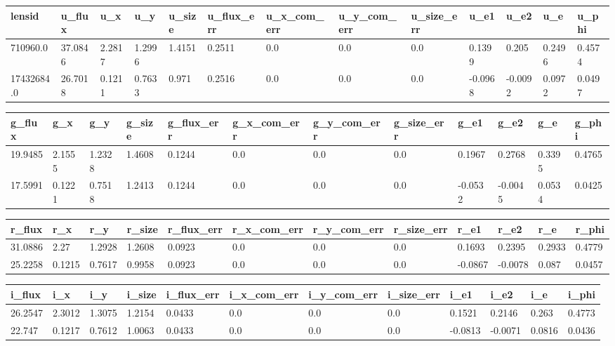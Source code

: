 \documentclass[\docopts]{\docclass}
\begin{document}
\begin{table}[!h]
\centering

\begin{tabular}{|l|l|l|l|l|l|l|l|l|l|l|l|l|}
\hline
lensid     & u\_flux & u\_x   & u\_y   & u\_size & u\_flux\_err & u\_x\_com\_err & u\_y\_com\_err & u\_size\_err & u\_e1   & u\_e2   & u\_e   & u\_phi \\ \hline
710960.0   & 37.0846 & 2.2817 & 1.2996 & 1.4151  & 0.2511       & 0.0            & 0.0            & 0.0          & 0.1399  & 0.205   & 0.2496 & 0.4574 \\ \hline
17432684.0 & 26.7018 & 0.1211 & 0.7633 & 0.971   & 0.2516       & 0.0            & 0.0            & 0.0          & -0.0968 & -0.0092 & 0.0972 & 0.0497 \\ \hline
\end{tabular}

\begin{tabular}{|l|l|l|l|l|l|l|l|l|l|ll|}
\hline
g\_flux & g\_x   & g\_y   & g\_size & g\_flux\_err & g\_x\_com\_err & g\_y\_com\_err & g\_size\_err & g\_e1   & g\_e2   & g\_e   & g\_phi	\\ \hline
19.9485 & 2.1555 & 1.2328 & 1.4608  & 0.1244       & 0.0            & 0.0            & 0.0          & 0.1967  & 0.2768  & 0.3395 & 0.4765 \\ \hline
17.5991 & 0.1221 & 0.7518 & 1.2413  & 0.1244       & 0.0            & 0.0            & 0.0          & -0.0532 & -0.0045 & 0.0534	& 0.0425	\\ \hline
\end{tabular}


\begin{tabular}{|l|l|l|l|l|l|l|l|l|l|l|l|}
\hline
r\_flux & r\_x   & r\_y   & r\_size & r\_flux\_err & r\_x\_com\_err & r\_y\_com\_err & r\_size\_err & r\_e1   & r\_e2   & r\_e   & r\_phi \\ \hline
31.0886 & 2.27   & 1.2928 & 1.2608  & 0.0923       & 0.0            & 0.0            & 0.0          & 0.1693  & 0.2395  & 0.2933 & 0.4779 \\
25.2258 & 0.1215 & 0.7617 & 0.9958  & 0.0923       & 0.0            & 0.0            & 0.0          & -0.0867 & -0.0078 & 0.087  & 0.0457 \\ \hline
\end{tabular}

\begin{tabular}{|l|l|l|l|l|l|l|l|l|l|l|l|}
\hline
i\_flux & i\_x   & i\_y   & i\_size & i\_flux\_err & i\_x\_com\_err & i\_y\_com\_err & i\_size\_err & i\_e1   & i\_e2   & i\_e   & i\_phi \\ \hline
26.2547 & 2.3012 & 1.3075 & 1.2154  & 0.0433       & 0.0            & 0.0            & 0.0          & 0.1521  & 0.2146  & 0.263  & 0.4773 \\
22.747  & 0.1217 & 0.7612 & 1.0063  & 0.0433       & 0.0            & 0.0            & 0.0          & -0.0813 & -0.0071 & 0.0816 & 0.0436 \\ \hline
\end{tabular}


\end{table}
\end{document}
